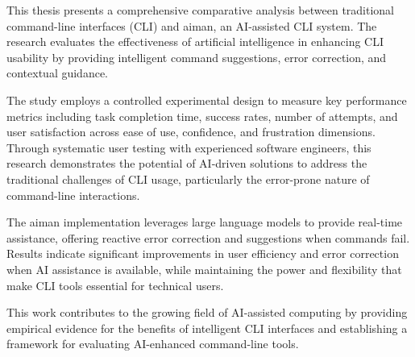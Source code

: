 This thesis presents a comprehensive comparative analysis between traditional command-line interfaces (CLI) and aiman, an AI-assisted CLI system. The research evaluates the effectiveness of artificial intelligence in enhancing CLI usability by providing intelligent command suggestions, error correction, and contextual guidance.

The study employs a controlled experimental design to measure key performance metrics including task completion time, success rates, number of attempts, and user satisfaction across ease of use, confidence, and frustration dimensions. Through systematic user testing with experienced software engineers, this research demonstrates the potential of AI-driven solutions to address the traditional challenges of CLI usage, particularly the error-prone nature of command-line interactions.

The aiman implementation leverages large language models to provide real-time assistance, offering reactive error correction and suggestions when commands fail. Results indicate significant improvements in user efficiency and error correction when AI assistance is available, while maintaining the power and flexibility that make CLI tools essential for technical users.

This work contributes to the growing field of AI-assisted computing by providing empirical evidence for the benefits of intelligent CLI interfaces and establishing a framework for evaluating AI-enhanced command-line tools.
